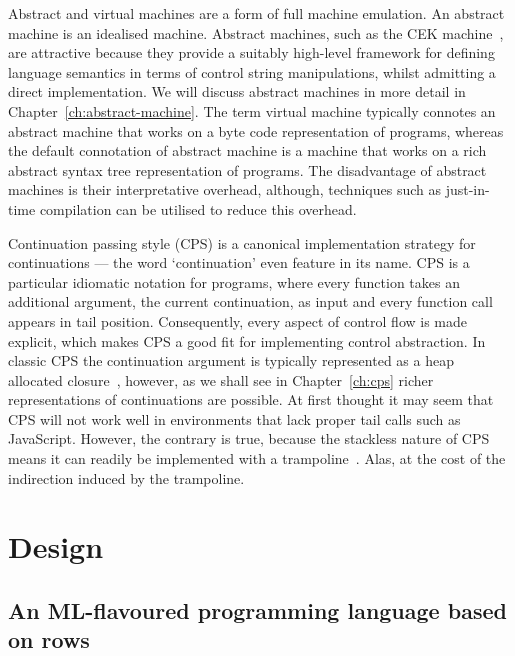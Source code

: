 \documentclass[12pt,phd,lfcs,twoside,openright,logo,leftchapter,normalheadings]{infthesis}
\theoremstyle{plain}
\theoremstyle{definition}
\begin{document}
Abstract and virtual machines are a form of full machine emulation. An
abstract machine is an idealised machine. Abstract machines, such as
the CEK machine~\cite{FelleisenF86}, are attractive because they
provide a suitably high-level framework for defining language
semantics in terms of control string manipulations, whilst admitting a
direct implementation.
%
We will discuss abstract machines in more detail in
Chapter~\ref{ch:abstract-machine}.
%
The term virtual machine typically connotes an abstract machine that
works on a byte code representation of programs, whereas the default
connotation of abstract machine is a machine that works on a rich
abstract syntax tree representation of programs.
%
The disadvantage of abstract machines is their interpretative
overhead, although, techniques such as just-in-time compilation can be
utilised to reduce this overhead.

Continuation passing style (CPS) is a canonical implementation
strategy for continuations --- the word `continuation' even feature in
its name.
%
CPS is a particular idiomatic notation for programs, where every
function takes an additional argument, the current continuation, as
input and every function call appears in tail position. Consequently,
every aspect of control flow is made explicit, which makes CPS a good
fit for implementing control abstraction. In classic CPS the
continuation argument is typically represented as a heap allocated
closure~\cite{Appel92}, however, as we shall see in
Chapter~\ref{ch:cps} richer representations of continuations are
possible.
%
At first thought it may seem that CPS will not work well in
environments that lack proper tail calls such as JavaScript. However,
the contrary is true, because the stackless nature of CPS means it can
readily be implemented with a trampoline~\cite{GanzFW99}. Alas, at the
cost of the indirection induced by the trampoline.

\part{Design}

\chapter{An ML-flavoured programming language based on rows}
\label{ch:base-language}
\end{document}
